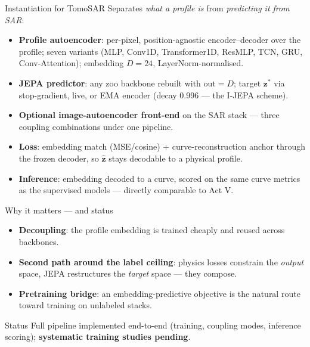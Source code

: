 \begin{frame}{Instantiation for TomoSAR}
  \small
  Separates \emph{what a profile is} from \emph{predicting it from SAR}:
  \begin{itemize}
    \item \textbf{Profile autoencoder}: per-pixel, position-agnostic encoder--decoder
          over the profile; seven variants (MLP, Conv1D, Transformer1D, ResMLP, TCN, GRU,
          Conv-Attention); embedding $D=24$, LayerNorm-normalised.
    \item \textbf{JEPA predictor}: any zoo backbone rebuilt with $\text{out} = D$;
          target $\mathbf z^{*}$ via stop-gradient, live, or EMA encoder (decay 0.996 ---
          the I-JEPA scheme).
    \item \textbf{Optional image-autoencoder front-end} on the SAR stack --- three
          coupling combinations under one pipeline.
    \item \textbf{Loss}: embedding match (MSE/cosine) + curve-reconstruction anchor
          through the frozen decoder, so $\hat{\mathbf z}$ stays decodable to a physical
          profile.
    \item \textbf{Inference}: embedding decoded to a curve, scored on the same curve
          metrics as the supervised models --- directly comparable to Act V.
  \end{itemize}
\end{frame}

\begin{frame}{Why it matters --- and status}
  \small
  \begin{itemize}
    \item \textbf{Decoupling}: the profile embedding is trained cheaply and reused across
          backbones.
    \item \textbf{Second path around the label ceiling}: physics losses constrain the
          \emph{output} space, JEPA restructures the \emph{target} space --- they
          compose.
    \item \textbf{Pretraining bridge}: an embedding-predictive objective is the natural
          route toward training on unlabeled stacks.
  \end{itemize}
  \begin{block}{\small Status}
    \small Full pipeline implemented end-to-end (training, coupling modes, inference
    scoring); \textbf{systematic training studies pending}.
  \end{block}
\end{frame}
